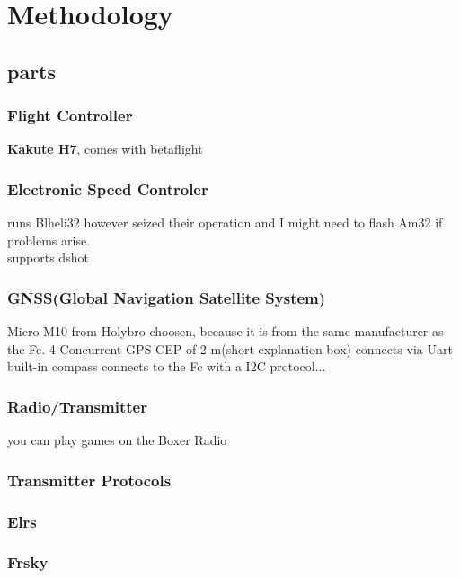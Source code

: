 \documentclass{article}
\newcommand{\comment}[1]{}
\begin{document}
	
	
	
	
	\section{Methodology}
	\comment{(only what has been done + which parts are needed and why I choose them)}
	\subsection{parts}
	
	\subsubsection[Fc]{Flight Controller}
	\textbf{Kakute H7}, comes with betaflight
	\subsubsection[ESC]{Electronic Speed Controler}
	runs Blheli32 however seized their operation and I might need to flash Am32 if problems arise.
	\\supports dshot 
	
	
	
	\subsubsection{GNSS(Global Navigation Satellite System)}
	Micro M10 from Holybro choosen, because it is from the same manufacturer as the Fc.
	4 Concurrent GPS
	CEP of 2 m(short explanation box)
	connects via Uart
	\\ built-in compass connects to the Fc with a I2C protocol...
	
	
	\subsubsection{Radio/Transmitter}
	
	you can play games on the Boxer Radio
	\subsubsection{Transmitter Protocols}
	\subsubsection*{Elrs}
	\subsubsection*{Frsky}
\end{document}
